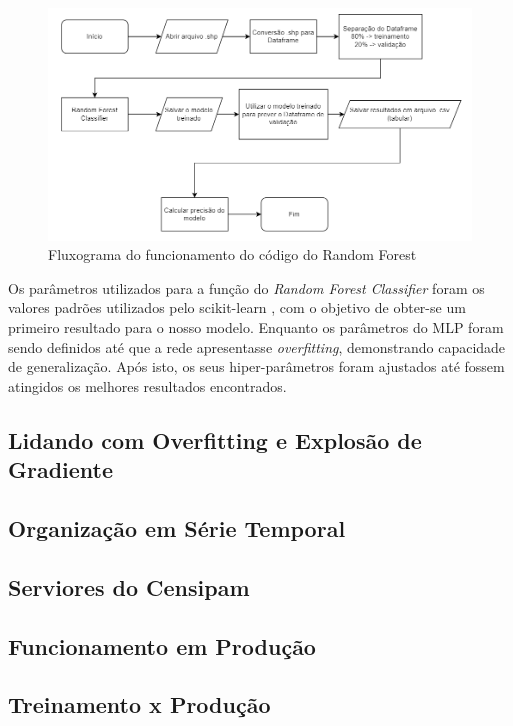 \begin{figure}[H]
	\centering
	\begin{minipage}{0.98\linewidth}
		\centering
		\includegraphics[width=\linewidth]{tg1/figuras/rfflux.png}
		\caption{Fluxograma do funcionamento do código do Random Forest} \label{fig:rfflux}
	\end{minipage}
\end{figure}
Os parâmetros utilizados para a função do \textit{Random Forest Classifier} foram os valores padrões utilizados pelo scikit-learn \cite{sklearnrfc}, com o objetivo de obter-se um primeiro resultado para o nosso modelo. Enquanto os parâmetros do MLP foram sendo definidos até que a rede apresentasse \textit{overfitting}, demonstrando capacidade de generalização. Após isto, os seus hiper-parâmetros foram ajustados até fossem atingidos os melhores resultados encontrados.

\subsection{Lidando com Overfitting e Explosão de Gradiente}
\subsection{Organização em Série Temporal}
\subsection{Serviores do Censipam}
\subsection{Funcionamento em Produção}
\subsection{Treinamento x Produção}
